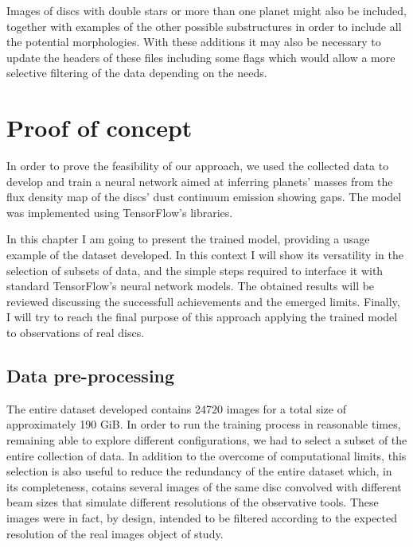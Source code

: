 \documentclass[a4paper,10pt]{report}
\begin{document}
Images of discs with double stars or more than one planet might also be included, together with examples
of the other possible substructures in order to include all the potential morphologies.
With these additions it may also be necessary to update the headers of these files including some flags which would allow 
a more selective filtering of the data depending on the needs.

\chapter{Proof of concept}

In order to prove the feasibility of our approach, we used the collected data to develop and train a neural network
aimed at inferring planets' masses from the flux density map of the discs' dust continuum emission showing gaps.
The model was implemented using TensorFlow's libraries.

In this chapter I am going to present the trained model, providing a usage example of
the dataset developed. In this context I will show its versatility in the selection 
of subsets of data, and the simple 
steps required to interface it with standard TensorFlow's neural network models.
The obtained results will be reviewed discussing the successfull achievements and the emerged limits.
Finally, I will try to reach the final purpose of this approach applying the trained
model to observations of real discs.

\section{Data pre-processing}

The entire dataset developed contains 24720 images for a total size of approximately 190 GiB.
In order to run the training process in reasonable times, remaining able to explore different configurations, we 
had to select a subset of the entire collection of data. In addition to the overcome of computational limits, 
this selection is also useful to reduce the redundancy of the entire dataset which, in its completeness, cotains
several images of the same disc convolved with different beam sizes
that simulate different resolutions of the observative tools.
These images were in fact, by design, intended to be filtered according to the expected resolution of the real
images object of study.
\end{document}
